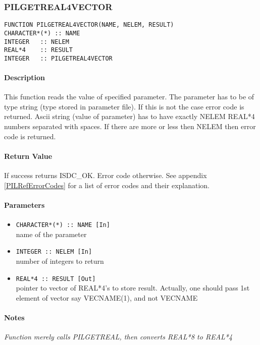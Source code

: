 \subsubsection{PILGETREAL4VECTOR}

\begin{verbatim}
FUNCTION PILGETREAL4VECTOR(NAME, NELEM, RESULT) 
CHARACTER*(*) :: NAME 
INTEGER   :: NELEM
REAL*4    :: RESULT 
INTEGER   :: PILGETREAL4VECTOR
\end{verbatim}

\paragraph{Description\\}
This function reads the value of specified parameter. The parameter has
to be of type string (type stored in parameter file). If this is not the
case error code is returned. Ascii string (value of parameter) has to have
exactly NELEM REAL*4 numbers separated with spaces. If there are more
or less then NELEM then error code is returned.

\paragraph{Return Value\\}
If success returns ISDC\_OK. Error code otherwise. See appendix \ref{PILRefErrorCodes}
for a list of error codes and their explanation.

\paragraph{Parameters}
\begin{itemize}
\item
{\tt CHARACTER*(*) :: NAME [In] } \\
name of the parameter 
\item
{\tt INTEGER   :: NELEM [In] } \\
number of integers to return
\item
{\tt REAL*4 :: RESULT [Out] } \\
pointer to vector of REAL*4's to store result. Actually, one should
pass 1st element of vector say VECNAME(1), and not VECNAME
\end{itemize}

\paragraph{Notes\\}
{\it
Function merely calls PILGETREAL, then converts REAL*8 to REAL*4
}


